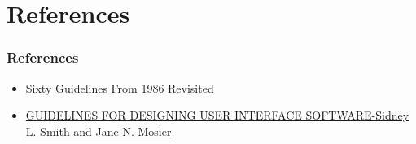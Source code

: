 \documentclass[11pt]{beamer}
\begin{document}
\section{References}
\begin{frame}
\frametitle{References}
\begin{itemize}
\item \href{https://www.nngroup.com/articles/sixty-guidelines-from-1986-revisited/}{Sixty Guidelines From 1986 Revisited}
\item \href{http://citeseerx.ist.psu.edu/viewdoc/download;jsessionid=690E3E1534AA8EBEF28FDE48927C4181?doi=10.1.1.84.8930&rep=rep1&type=pdf}{GUIDELINES FOR DESIGNING
USER INTERFACE SOFTWARE-Sidney L. Smith and Jane N. Mosier}
\end{itemize}
\end{frame}
\end{document}
